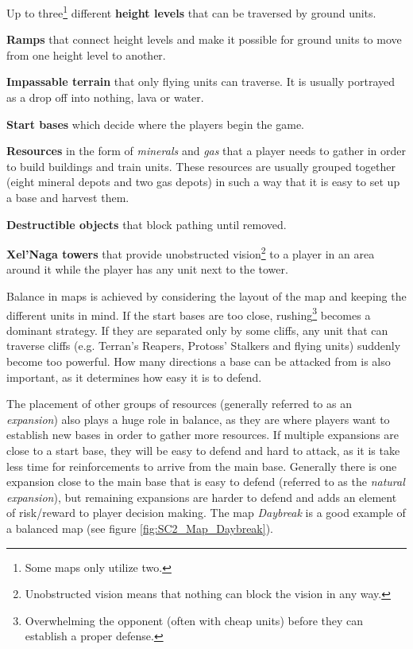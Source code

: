 \begin{my_itemize}

	\item Up to three\footnote{Some maps only utilize two.} different \textbf{height levels} that can be traversed by ground units.

	\item \textbf{Ramps} that connect height levels and make it possible for ground units to move from one height level to another.

	\item \textbf{Impassable terrain} that only flying units can traverse. It is usually portrayed as a drop off into nothing, lava or water.

	\item \textbf{Start bases} which decide where the players begin the game.

	\item \textbf{Resources} in the form of \textit{minerals} and \textit{gas} that a player needs to gather in order to build buildings and train units. These resources are usually grouped together (eight mineral depots and two gas depots) in such a way that it is easy to set up a base and harvest them.

	\item \textbf{Destructible objects} that block pathing until removed.

	\item \textbf{Xel'Naga towers} that provide unobstructed vision\footnote{Unobstructed vision means that nothing can block the vision in any way.} to a player in an area around it while the player has any unit next to the tower.

\end{my_itemize}

Balance in maps is achieved by considering the layout of the map and keeping the different units in mind. If the start bases are too close, rushing\footnote{Overwhelming the opponent (often with cheap units) before they can establish a proper defense.} becomes a dominant strategy. If they are separated only by some cliffs, any unit that can traverse cliffs (e.g. Terran's Reapers, Protoss' Stalkers and flying units) suddenly become too powerful. How many directions a base can be attacked from is also important, as it determines how easy it is to defend.

The placement of other groups of resources (generally referred to as an \textit{expansion}) also plays a huge role in balance, as they are where players want to establish new bases in order to gather more resources. If multiple expansions are close to a start base, they will be easy to defend and hard to attack, as it is take less time for reinforcements to arrive from the main base. Generally there is one expansion close to the main base that is easy to defend (referred to as the \textit{natural expansion}), but remaining expansions are harder to defend and adds an element of risk/reward to player decision making. The map \textit{Daybreak} is a good example of a balanced map (see figure \ref{fig:SC2_Map_Daybreak}).

